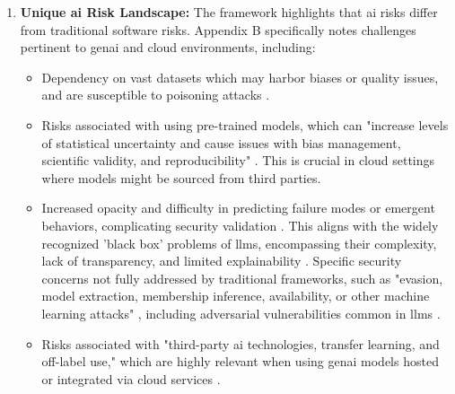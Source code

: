 \begin{enumerate}
\item \textbf{Unique \gls{ai} Risk Landscape:} The framework highlights that \gls{ai} risks differ from traditional software risks. Appendix B specifically notes challenges pertinent to \gls{genai} and cloud environments, including:
\begin{itemize}
\item Dependency on vast datasets which may harbor biases or quality issues, and are susceptible to poisoning attacks \cite{tabassi_artificial_2023}.
\item Risks associated with using pre-trained models, which can "increase levels of statistical uncertainty and cause issues with bias management, scientific validity, and reproducibility" \cite[p.38]{tabassi_artificial_2023}. This is crucial in cloud settings where models might be sourced from third parties.
\item Increased opacity and difficulty in predicting failure modes or emergent behaviors, complicating security validation \cite{tabassi_artificial_2023}. This aligns with the widely recognized 'black box' problems of \glspl{llm}, encompassing their complexity, lack of transparency, and limited explainability \cite{dash_zero-trust_2024}.
Specific security concerns not fully addressed by traditional frameworks, such as "evasion, model extraction, membership inference, availability, or other machine learning attacks" \cite[p.39]{tabassi_artificial_2023}, including adversarial vulnerabilities common in \glspl{llm} \cite{dash_zero-trust_2024}.
\item Risks associated with "third-party \gls{ai} technologies, transfer learning, and off-label use," which are highly relevant when using \gls{genai} models hosted or integrated via cloud services \cite[p.39]{tabassi_artificial_2023}.
\end{itemize}


\end{enumerate}
